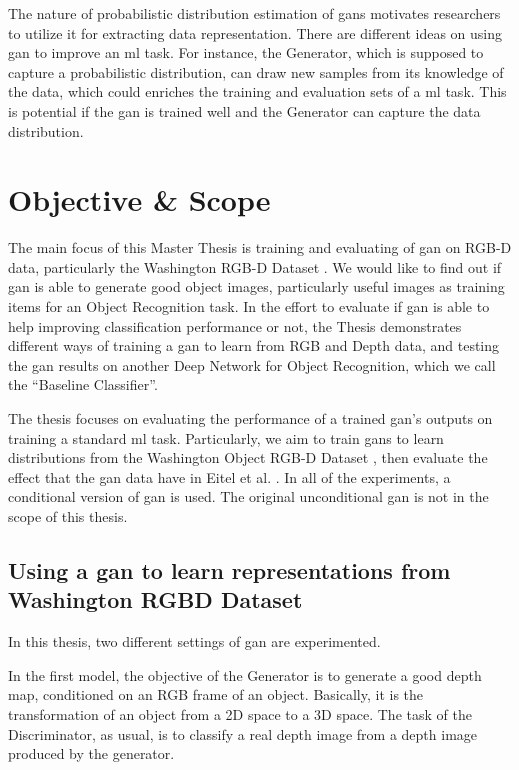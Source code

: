 The nature of probabilistic distribution estimation of \acrshort{gan}s motivates
researchers to utilize it for extracting data representation. There are different ideas on
using \acrshort{gan} to improve an \acrshort{ml} task. For instance, the Generator, which
is supposed to capture a probabilistic distribution, can draw new samples from its
knowledge of the data, which could enriches the training and evaluation sets of a
\acrshort{ml} task. This is potential if the \acrshort{gan} is trained well and the
Generator can capture the data distribution.

\section{Objective \& Scope \label{sec:objective}}
The main focus of this Master Thesis is training and evaluating of \acrfull{gan} on RGB-D
data, particularly the Washington RGB-D Dataset \cite{washington_rgbd}. We would like to
find out if \acrshort{gan} is able to generate good object images, particularly useful
images as training items for an Object Recognition task. In the effort to evaluate if
\acrshort{gan} is able to help improving classification performance
or not, the Thesis demonstrates different ways of training a \acrshort{gan}
to learn from RGB and Depth data, and testing the \acrshort{gan} results on another Deep
Network for Object Recognition, which we call the ``Baseline Classifier''.

The thesis focuses on evaluating the performance of a trained \acrshort{gan}'s outputs on
training a standard \acrshort{ml} task. Particularly, we aim to train \acrshort{gan}s to
learn distributions from the Washington Object RGB-D Dataset \cite{washington_rgbd}, then
evaluate the effect that the \acrshort{gan} data have in Eitel et al. \cite{eitel}. In all
of the experiments, a conditional version of \acrshort{gan} is used. The original
unconditional \acrshort{gan} is not in the scope of this thesis.  

\subsection{Using a \acrshort{gan} to learn representations from Washington RGBD Dataset} 
In this thesis, two different settings of \acrshort{gan} are experimented. 

In the first model, the objective of the Generator is to generate a good depth map,
conditioned on an RGB frame of an object. Basically, it is the transformation of an object
from a 2D space to a 3D space. The task of the Discriminator, as usual, is to classify a
real depth image from a depth image produced by the generator.

